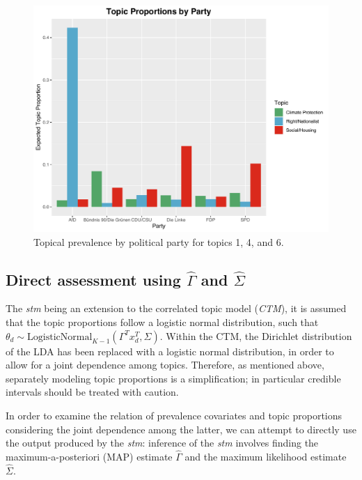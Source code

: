 \begin{figure}[h!]
  \centering
  \captionsetup{justification=centering,margin=2cm}
  \includegraphics[scale = 0.5]{../plots/4_4/quasi_t146_cat.pdf}
  \caption{Topical prevalence by political party for topics 1, 4, and 6.}
  \label{fig:boat1}
\end{figure}

\subsection{Direct assessment using $\hat{\Gamma}$ and $\hat{\Sigma}$}

The \textit{stm} being an extension to the correlated topic model (\textit{CTM}), it is assumed that the topic proportions follow a logistic normal distribution, such that $\theta_d \sim \text{LogisticNormal}_{K-1}(\Gamma^Tx_d^T, \Sigma)$. Within the CTM, the Dirichlet distribution of the LDA has been replaced with a logistic normal distribution, in order to allow for a joint dependence among topics. Therefore, as mentioned above, separately modeling topic proportions is a simplification; in particular credible intervals should be treated with caution.

In order to examine the relation of prevalence covariates and topic proportions considering the joint dependence among the latter, we can attempt to directly use the output produced by the \textit{stm}: inference of the \textit{stm} involves finding the maximum-a-posteriori (MAP) estimate $\hat{\Gamma}$ and the maximum likelihood estimate $\hat{\Sigma}$. 

